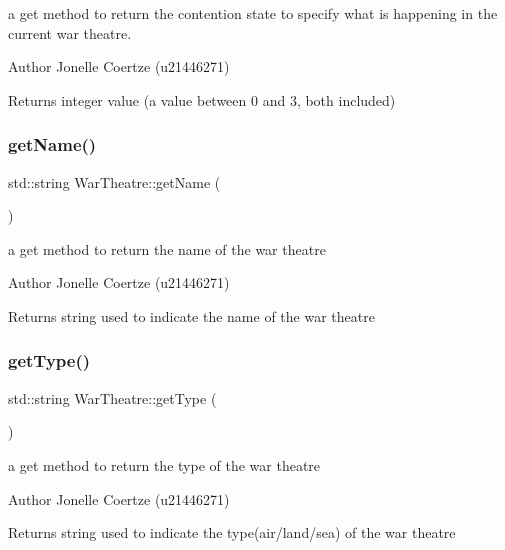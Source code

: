 a get method to return the contention state to specify what is happening in the current war theatre. 

\begin{DoxyAuthor}{Author}
Jonelle Coertze (u21446271) 
\end{DoxyAuthor}
\begin{DoxyReturn}{Returns}
integer value (a value between 0 and 3, both included) 
\end{DoxyReturn}
\mbox{\label{class_war_theatre_a4ecfdcdbc85833b4be2f69df2c0ed195}} 
\subsubsection{\texorpdfstring{getName()}{getName()}}
{\footnotesize\ttfamily std\+::string War\+Theatre\+::get\+Name (\begin{DoxyParamCaption}{ }\end{DoxyParamCaption})}



a get method to return the name of the war theatre 

\begin{DoxyAuthor}{Author}
Jonelle Coertze (u21446271) 
\end{DoxyAuthor}
\begin{DoxyReturn}{Returns}
string used to indicate the name of the war theatre 
\end{DoxyReturn}
\mbox{\label{class_war_theatre_a5833b9da41252b8339f0b2cf1873648f}} 
\subsubsection{\texorpdfstring{getType()}{getType()}}
{\footnotesize\ttfamily std\+::string War\+Theatre\+::get\+Type (\begin{DoxyParamCaption}{ }\end{DoxyParamCaption})}



a get method to return the type of the war theatre 

\begin{DoxyAuthor}{Author}
Jonelle Coertze (u21446271) 
\end{DoxyAuthor}
\begin{DoxyReturn}{Returns}
string used to indicate the type(air/land/sea) of the war theatre 
\end{DoxyReturn}
\mbox{\label{class_war_theatre_a776ea7d7c2cc732d7eb0f0298e4cde8b}} 
